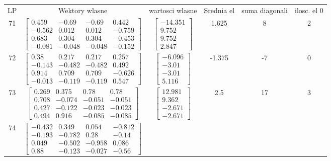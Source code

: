 \documentclass[a4paper,12pt]{article}
\begin{document}
\bgroup {} \vspace{0.2in} \begin{tabular}{c c c c c c}
LP &Wektory wlasne & wartosci wlasne & Srednia el & suma diagonali & ilosc. el 0\\
71
&
$\begin{bmatrix} 0.459 & -0.69 & -0.69 & 0.442 \\ -0.562 & 0.012 & 0.012 & -0.759 \\ 0.683 & 0.304 & 0.304 & -0.453 \\ -0.081 & -0.048 & -0.048 & -0.152 \end{bmatrix}$
&
$\begin{bmatrix} -14.351 \\ 9.752 \\ 9.752 \\ 2.847 \end{bmatrix}$
&
1.625
&
8
&
2
\\
72
&
$\begin{bmatrix} 0.38 & 0.217 & 0.217 & 0.257 \\ -0.143 & -0.482 & -0.482 & 0.492 \\ 0.914 & 0.709 & 0.709 & -0.626 \\ -0.013 & -0.119 & -0.119 & 0.547 \end{bmatrix}$
&
$\begin{bmatrix} -6.096 \\ -3.01 \\ -3.01 \\ 5.116 \end{bmatrix}$
&
-1.375
&
-7
&
0
\\
73
&
$\begin{bmatrix} 0.269 & 0.375 & 0.78 & 0.78 \\ 0.708 & -0.074 & -0.051 & -0.051 \\ 0.427 & -0.122 & -0.023 & -0.023 \\ 0.494 & 0.916 & -0.085 & -0.085 \end{bmatrix}$
&
$\begin{bmatrix} 12.981 \\ 9.362 \\ -2.671 \\ -2.671 \end{bmatrix}$
&
2.5
&
17
&
3
\\
74
&
$\begin{bmatrix} -0.432 & 0.349 & 0.054 & -0.812 \\ -0.193 & -0.782 & 0.28 & -0.14 \\ 0.049 & -0.502 & -0.958 & 0.086 \\ 0.88 & -0.123 & -0.027 & -0.56 \end{bmatrix}$

\end{tabular}
\end{document}
